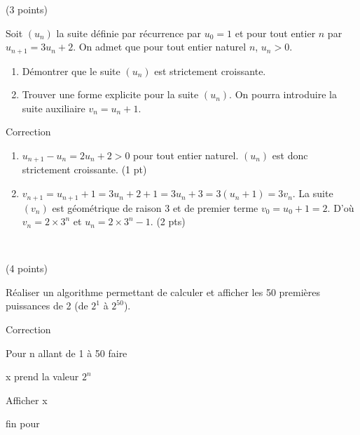 \documentclass[a4paper,11pt]{article}
\theoremstyle{break}
\begin{document}
  \begin{exo}(3 points)

Soit $(u_n)$ la suite définie par récurrence par $u_0=1$ et pour tout entier $n$ par 
$u_{n+1}=3 u_n +2$. On admet que pour tout entier naturel $n$, $u_n>0$.

\begin{enumerate}
  \item Démontrer que le suite $(u_n)$ est strictement croissante.
  \item Trouver une forme explicite pour la suite $(u_n)$. On pourra introduire la suite auxiliaire
  $v_n=u_n+1$.
\end{enumerate}

\begin{correction}

Correction
\begin{enumerate}
 \item $u_{n+1}-u_n=2u_n+2>0$ pour tout entier naturel. $(u_n)$ est donc strictement croissante. (1 pt)
 \item $v_{n+1}=u_{n+1}+1=3 u_n+2+1=3 u_n +3=3(u_n+1)=3 v_n$. La suite $(v_n)$ est g\'eom\'etrique
  de raison 3 et de premier terme $v_0=u_0+1=2$. D'o\`u $v_n=2 \times 3^n$ et $u_n=2 \times 3^n-1$. (2 pts)
\end{enumerate}


\end{correction}

\begin{correction}

\end{correction}


\end{exo}

 ~
  \vspace{1cm} 
 
  \begin{exo}(4 points)
~
      \vspace{0.25cm}
      
      Réaliser un algorithme permettant de calculer et afficher les 50 premières puissances de 2 (de $2^1$ à $2^{50}$).
            
      
\begin{correction}

Correction

   Pour n allant de 1 \`a 50 faire
   
      x prend la valeur $2^n$
      
      Afficher x
      
   fin pour
      
      
      
\end{correction}      
      
      
\end{exo}  
    
\end{document}
